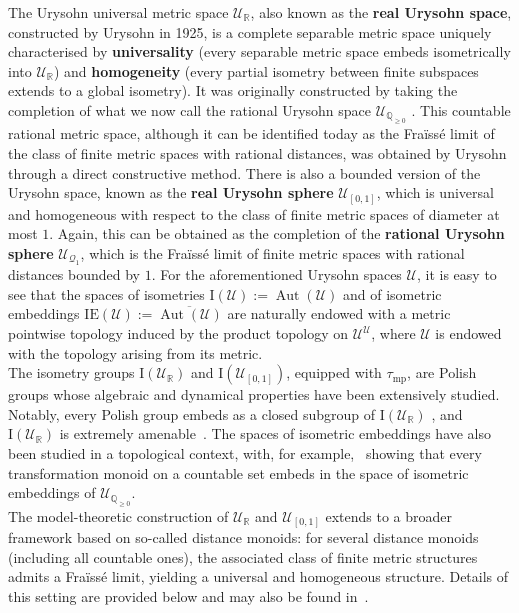 \documentclass{article}
\theoremstyle{remark}
\theoremstyle{definition}
\DeclareMathOperator{\Aut}{Aut}
\newcommand{\U}[0]{\mathbb{U}}
\renewcommand{\U}[0]{\mathcal{U}}
\newcommand{\mpw}[0]{\tau_{\mathrm{mp}}}
\renewcommand\geq{\geqslant}
\newcommand{\ie}[0]{\mathrm{IE}}
\begin{document}
{{{{{The Urysohn universal metric space $\U_{\mathbb R}$, also known as the \textbf{real Urysohn space},  constructed by Urysohn in 1925, is a complete separable metric space uniquely characterised by {\bf universality} (every separable metric space embeds isometrically into $\U_{\mathbb R}$) and {\bf %
homogeneity} (every partial isometry between finite subspaces extends to a global isometry). 
It was originally constructed by taking the completion of what we now call the rational Urysohn space  $\U_{\mathbb{Q}_{\geq 0}}$ . This countable rational metric space, although it can be identified today as the Fraïssé limit of the class of finite metric spaces with rational distances, was obtained by Urysohn through a direct constructive method. 
There is also a bounded version of the Urysohn space, known as the \textbf{real Urysohn sphere} $\U_{[0,1]}$, which is universal and homogeneous with respect to the class of  finite metric spaces of diameter at most $1$. 
Again, this can be obtained as the completion of the \textbf{rational Urysohn sphere} $\U_{\mathcal{Q}_1}$, which is the Fra\"{i}ss\'{e} limit of finite metric spaces with rational distances bounded by $1$. {For the aforementioned Urysohn spaces $\U$,} it is easy to see that the spaces of isometries
{$\mathrm{I}(\U):=\Aut(\U)$ and {of} isometric embeddings $\ie(\U):=\overline{\Aut(\U)}$}
are naturally endowed with a metric pointwise topology induced by the product topology on $\U^\U$, where $\U$ is endowed with the topology arising from its metric.\\


The isometry groups $\mathrm{I}(\U_{\mathbb R})$ and $\mathrm{I}(\U_{[0,1]})$, equipped with $\mpw$, are Polish groups whose algebraic and dynamical properties have been extensively studied. Notably, every Polish group embeds as a closed subgroup of $\mathrm{I}(\U_{\mathbb R})$ \cite{uspenskij1990group}, and $\mathrm{I}(\U_{\mathbb R})$  is extremely amenable~\cite{pestov2002ramsey}. The spaces of isometric embeddings have also been studied in a topological context, with, for example,~\cite{kubis2017katetov} showing that every transformation monoid on a countable set embeds in the space of isometric embeddings of $\U_{\mathbb{Q}_{\geq 0}}$.\\

The model-theoretic construction of  $\U_{\mathbb R}$ and $\U_{[0,1]}$  extends to a broader framework based on so-called distance monoids: for %
{several distance monoids (including all countable ones),} the associated class of finite metric structures admits a Fra\"iss\'e limit, yielding a universal and homogeneous structure. Details of this setting are provided below and may also be found in~\cite{con15}.\\

}}}}}
\end{document}

